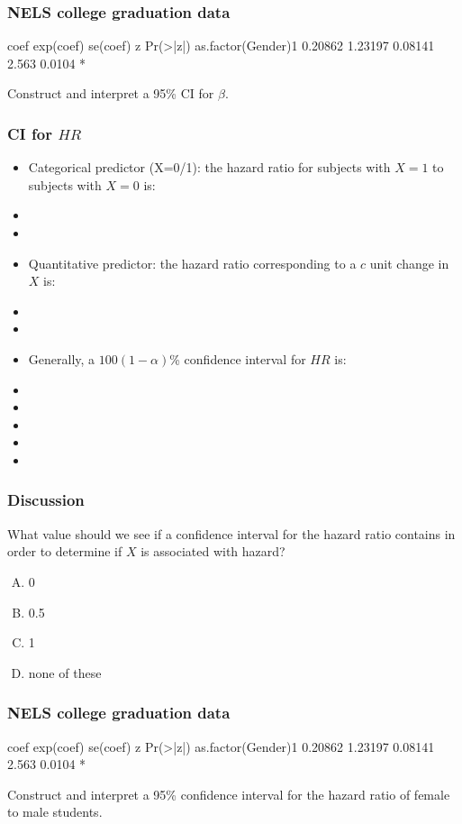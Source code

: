 \begin{frame}[fragile]
\frametitle{NELS college graduation data}
\begin{Rout}{-0.05}
                      coef exp(coef) se(coef)     z Pr(>|z|)
as.factor(Gender)1 0.20862   1.23197  0.08141 2.563   0.0104 *
\end{Rout}
Construct and interpret a 95\% CI for $\beta$.
\vskip200pt
\end{frame}

\begin{frame}
\frametitle{CI for $HR$}
\begin{itemize}
\item Categorical predictor (X=0/1): the hazard ratio for subjects with $X=1$ to subjects with $X=0$ is:
\item[]
\item[]
\item Quantitative predictor: the hazard ratio corresponding to a $c$ unit change in $X$ is:
\item[]
\item[]
\item Generally, a $100(1-\alpha)$\% confidence interval for $HR$ is:
\item[]
\item[]
\item[]
\item[]
\item[]
\end{itemize}
\end{frame}

\begin{frame}
\frametitle{Discussion}
\begin{clicker}{What value should we see if a confidence interval for the hazard ratio contains in order to determine if $X$ is associated with hazard?}
\begin{enumerate}[A.]
\item 0
\item 0.5
\item 1
\item none of these
\end{enumerate}
\end{clicker}
\end{frame}

\begin{frame}[fragile]
\frametitle{NELS college graduation data}

\begin{Rout}{-0.05}
                      coef exp(coef) se(coef)     z Pr(>|z|)
as.factor(Gender)1 0.20862   1.23197  0.08141 2.563   0.0104 *
\end{Rout}
Construct and interpret a 95\% confidence interval for the hazard ratio of female to male students.
\vskip200pt
\end{frame}

